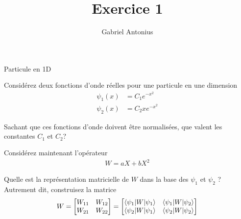 \documentclass[12pt,solution=false]{uqtrassignment}
\title{Exercice 1}
\author{Gabriel Antonius}
\begin{document}
\maketitle




\begin{problem}{Particule en 1D}

Considérez deux fonctions d'onde réelles
  pour une particule en une dimension
\begin{align}
  \psi_1(x) &= C_1 e^{-x^2}
\\
  \psi_2(x) &= C_2 x e^{-x^2}
\end{align}



\subproblem
Sachant que ces fonctions d'onde doivent être normalisées,
  que valent les constantes $C_1$ et $C_2$?

\subproblem
Considérez maintenant l'opérateur
\begin{align}
  W = a X + b X^2
\end{align}

Quelle est la représentation matricielle de $W$ dans la base des
  $\psi_1$ et $\psi_2$ ?
Autrement dit,
  construisez la matrice
\begin{align}
  W
  =
  \begin{bmatrix}
    W_{11}
    &
    W_{12}
    \\
    W_{21}
    &
    W_{22}
    \\
  \end{bmatrix}
  =
  \begin{bmatrix}
    \braket{\psi_1 \vert W \vert \psi_1}
    &
    \braket{\psi_1 \vert W \vert \psi_2}
    \\
    \braket{\psi_2 \vert W \vert \psi_1}
    &
    \braket{\psi_2 \vert W \vert \psi_2}
    \\
  \end{bmatrix}
\end{align}


\begin{solution}
\end{solution}
\end{problem}
\end{document}
